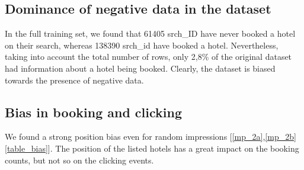 \documentclass[9pt]{llncs}
\begin{document}
\subsection{Dominance of negative data in the dataset}
In the full training set, we found that 61405 srch\_ID have never booked a hotel on their search, whereas 138390 srch\_id have booked a hotel. Nevertheless, taking into account the total number of rows, only 2,8\% of the original dataset had information about a hotel being booked. Clearly, the dataset is biased towards the presence of negative data.

\subsection{Bias in booking and clicking}
We found a strong position bias even for random impressions [\ref{mp_2a},\ref{mp_2b} \ref{table_bias}]. The position of the listed hotels has a great impact on the booking counts, but not so on the clicking events. 
\end{document}
